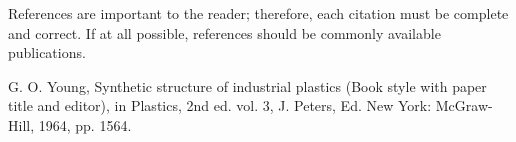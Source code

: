 \documentclass[letterpaper, 10 pt, conference]{ieeeconf}  %
\begin{document}
References are important to the reader; therefore, each citation must be complete and correct. If at all possible, references should be commonly available publications.



\begin{thebibliography}{99}

 G. O. Young, Synthetic structure of industrial plastics (Book style with paper title and editor), 	in Plastics, 2nd ed. vol. 3, J. Peters, Ed.  New York: McGraw-Hill, 1964, pp. 1564.







\end{thebibliography}
\end{document}
